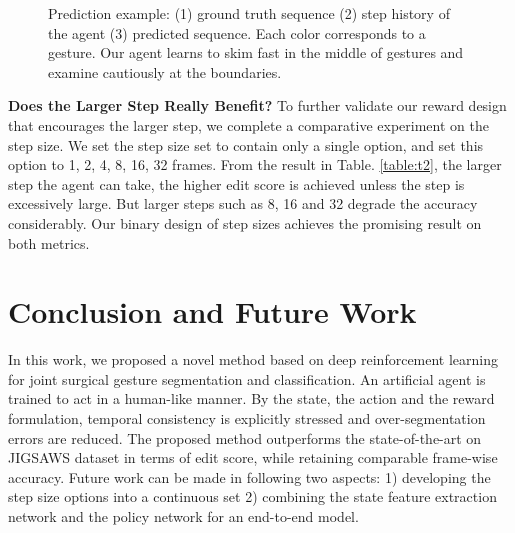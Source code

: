 \documentclass{llncs}
\begin{document}
\begin{figure}[t]
\centering
{}
\caption{Prediction example: (1) ground truth sequence (2) step history of the agent (3) predicted sequence. Each color corresponds to a gesture. Our agent learns to skim fast in the middle of gestures and examine cautiously at the boundaries.}
\label{fig:f2}
\end{figure}

\textbf{Does the Larger Step Really Benefit?} To further validate our reward design that encourages the larger step, we complete a comparative experiment on the step size. We set the step size set  to contain only a single option, and set this option to 1, 2, 4, 8, 16, 32 frames. From the result in Table. \ref{table:t2}, the larger step the agent can take, the higher edit score is achieved unless the step is excessively large. But larger steps such as 8, 16 and 32 degrade the accuracy considerably. Our binary design of step sizes achieves the promising result on both metrics.

\begin{table}[t]
\centering
\caption{Experiments on step size}
\label{table:t2}
\end{table}

\section{Conclusion and Future Work}

In this work, we proposed a novel method based on deep reinforcement learning for joint surgical gesture segmentation and classification. An artificial agent is trained to act in a human-like manner. By the state, the action and the reward formulation, temporal consistency is explicitly stressed and over-segmentation errors are reduced. The proposed method outperforms the state-of-the-art on JIGSAWS dataset in terms of edit score, while retaining comparable frame-wise accuracy. Future work can be made in following two aspects: 1) developing the step size options into a continuous set 2) combining the state feature extraction network and the policy network for an end-to-end model.
\end{document}
